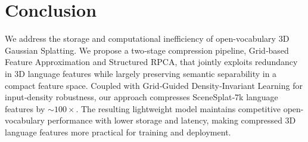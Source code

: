\documentclass{article}
\begin{document}
\section{Conclusion}
We address the storage and computational inefficiency of open-vocabulary 3D Gaussian Splatting. We propose a two‑stage compression pipeline, Grid‑based Feature Approximation and Structured RPCA, that jointly exploits redundancy in 3D language features while largely preserving semantic separability in a compact feature space. Coupled with Grid‑Guided Density‑Invariant Learning for input‑density robustness, our approach compresses SceneSplat‑7k language features by $\sim100\times$. The resulting lightweight model maintains competitive open-vocabulary performance with lower storage and latency, making compressed 3D language features more practical for training and deployment.




\clearpage
\appendix
{}
\makeatletter
{}
\renewcommand\thefigure{\thesection.\arabic{figure}}
\renewcommand\thetable{\thesection.\arabic{table}}
\renewcommand\theHfigure{\thesection.\arabic{figure}}
\renewcommand\theHtable{\thesection.\arabic{table}}
\makeatother

\newpage

\end{document}
